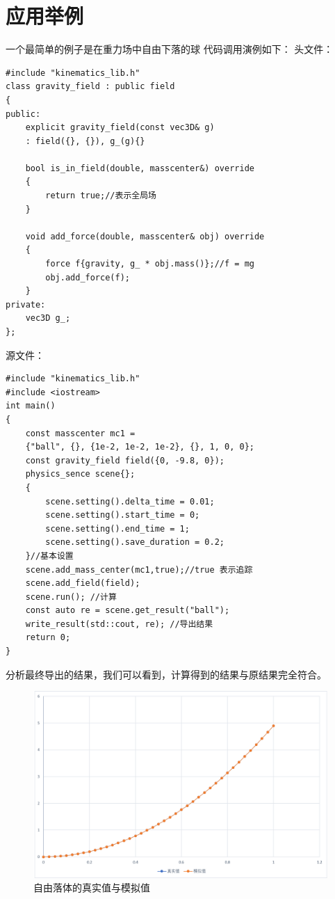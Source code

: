 \section{应用举例}
一个最简单的例子是在重力场中自由下落的球
代码调用演例如下：
头文件：
{\setmainfont{Consolas}
\begin{lstlisting}
#include "kinematics_lib.h"  
class gravity_field : public field
{
public:
    explicit gravity_field(const vec3D& g) 
    : field({}, {}), g_(g){}

    bool is_in_field(double, masscenter&) override
    {
        return true;//表示全局场
    }

    void add_force(double, masscenter& obj) override
    {
        force f{gravity, g_ * obj.mass()};//f = mg
        obj.add_force(f);
    }
private:
    vec3D g_;
};
    \end{lstlisting}}\label{code_g}
源文件：
{\setmainfont{Consolas}
\begin{lstlisting}
#include "kinematics_lib.h"
#include <iostream>
int main()
{
    const masscenter mc1 =
    {"ball", {}, {1e-2, 1e-2, 1e-2}, {}, 1, 0, 0};
    const gravity_field field({0, -9.8, 0});
    physics_sence scene{};
    {
        scene.setting().delta_time = 0.01;
        scene.setting().start_time = 0;
        scene.setting().end_time = 1;
        scene.setting().save_duration = 0.2;
    }//基本设置
    scene.add_mass_center(mc1,true);//true 表示追踪
    scene.add_field(field);
    scene.run(); //计算
    const auto re = scene.get_result("ball");
    write_result(std::cout, re); //导出结果
    return 0;
}
\end{lstlisting}
}

分析最终导出的结果，我们可以看到，计算得到的结果与原结果完全符合。

\begin{figure} [bh]
    \centering 
    \includegraphics[width=.75\textwidth]{statics1.png}
\caption{自由落体的真实值与模拟值} 
\end{figure}

